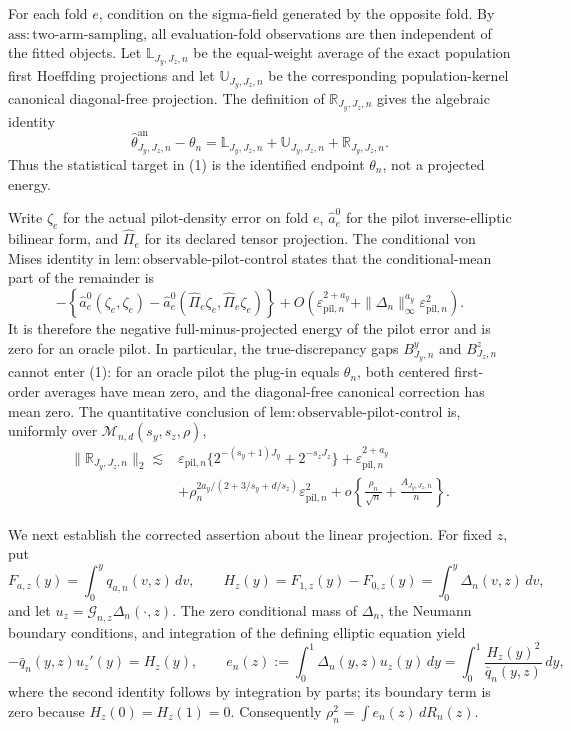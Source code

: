 For each fold \(e\), condition on the sigma-field generated by the opposite fold.  By \(\mathrm{ass{:}two\text{-}arm\text{-}sampling}\), all evaluation-fold observations are then independent of the fitted objects.  Let \(\mathbb L_{J_y,J_z,n}\) be the equal-weight average of the exact population first Hoeffding projections and let \(\mathbb U_{J_y,J_z,n}\) be the corresponding population-kernel canonical diagonal-free projection.  The definition of \(\mathbb R_{J_y,J_z,n}\) gives the algebraic identity
\[
\widehat\theta^{\mathrm{an}}_{J_y,J_z,n}-\theta_n
=\mathbb L_{J_y,J_z,n}+\mathbb U_{J_y,J_z,n}+\mathbb R_{J_y,J_z,n}.                 \tag{1}
\]
Thus the statistical target in (1) is the identified endpoint \(\theta_n\), not a projected energy.

Write \(\zeta_e\) for the actual pilot-density error on fold \(e\), \(\widehat a_e^0\) for the pilot inverse-elliptic bilinear form, and \(\widehat\Pi_e\) for its declared tensor projection.  The conditional von Mises identity in \(\mathrm{lem{:}observable\text{-}pilot\text{-}control}\) states that the conditional-mean part of the remainder is
\[
-\left\{\widehat a_e^0(\zeta_e,\zeta_e)
-\widehat a_e^0(\widehat\Pi_e\zeta_e,\widehat\Pi_e\zeta_e)\right\}
+O\!\left(\varepsilon_{\mathrm{pil},n}^{2+a_y}
+\|\Delta_n\|_\infty^{a_y}\varepsilon_{\mathrm{pil},n}^{2}\right).             \tag{2}
\]
It is therefore the negative full-minus-projected energy of the pilot error and is zero for an oracle pilot.  In particular, the true-discrepancy gaps \(B^y_{J_y,n}\) and \(B^z_{J_z,n}\) cannot enter (1): for an oracle pilot the plug-in equals \(\theta_n\), both centered first-order averages have mean zero, and the diagonal-free canonical correction has mean zero.  The quantitative conclusion of \(\mathrm{lem{:}observable\text{-}pilot\text{-}control}\) is, uniformly over \(\mathcal M_{n,d}(s_y,s_z,\rho)\),
\[
\begin{split}
\|\mathbb R_{J_y,J_z,n}\|_2
\lesssim{}&\varepsilon_{\mathrm{pil},n}
\{2^{-(s_y+1)J_y}+2^{-s_zJ_z}\}
+\varepsilon_{\mathrm{pil},n}^{2+a_y}\\
&+\rho_n^{2a_y/(2+3/s_y+d/s_z)}\varepsilon_{\mathrm{pil},n}^{2}
+o\!\left\{\frac{\rho_n}{\sqrt n}+\frac{A_{J_y,J_z,n}}n\right\}.              \tag{3}
\end{split}
\]

We next establish the corrected assertion about the linear projection.  For fixed \(z\), put
\[
F_{a,z}(y)=\int_0^yq_{a,n}(v,z)\,dv,
\qquad
H_z(y)=F_{1,z}(y)-F_{0,z}(y)=\int_0^y\Delta_n(v,z)\,dv,
\]
and let \(u_z=\mathcal G_{n,z}\Delta_n(\cdot,z)\).  The zero conditional mass of \(\Delta_n\), the Neumann boundary conditions, and integration of the defining elliptic equation yield
\[
-\bar q_n(y,z)u_z'(y)=H_z(y),
\qquad
e_n(z):=\int_0^1\Delta_n(y,z)u_z(y)\,dy
=\int_0^1\frac{H_z(y)^2}{\bar q_n(y,z)}\,dy,                                    \tag{4}
\]
where the second identity follows by integration by parts; its boundary term is zero because \(H_z(0)=H_z(1)=0\).  Consequently \(\rho_n^2=\int e_n(z)\,dR_n(z)\).

